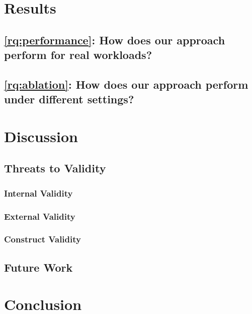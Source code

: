\section{Results}\label{sec:results}

\subsection*{\cref{rq:performance}: How does our approach perform for real workloads?}

\subsection*{\cref{rq:ablation}: How does our approach perform under different settings?}

\section{Discussion}\label{sec:discussion}

\subsection{Threats to Validity}

\subsubsection{Internal Validity}

\subsubsection{External Validity}

\subsubsection{Construct Validity}

\subsection{Future Work}

\section{Conclusion}\label{sec:conclusion}

\printbibliography

